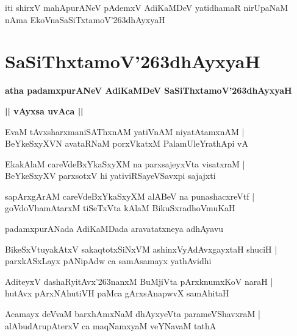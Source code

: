 \documentclass[twoside,12pt,openright]{book}
\def\S{\char'263}
\newcounter{shloka}[chapter]
\def\uvaca#1{\centerline{{\large\textbf{#1}}}}
\begin{document}
\begin{center}
iti shirxV mahApurANeV pAdemxV AdiKaMDeV yatidhamaR nirUpaNaM nAma EkoVnaSaSiTxtamoV\S dhAyxyaH 
\end{center}

\chapter{SaSiThxtamoV\S dhAyxyaH}

\begin{center}
{\LARGE\bfseries atha padamxpurANeV AdiKaMDeV SaSiThxtamoV\S dhAyxyaH}
\end{center}

\uvaca{|| vAyxsa uvAca ||}

\begin{shloka}
EvaM tAvxsharxmaniSAThxnAM yatiVnAM niyatAtamxnAM |\\
BeYkeSxyXVN avataRNaM porxVkatxM PalamUleYrathApi vA 
\end{shloka}

\begin{shloka}
EkakAlaM careVdeBxYkaSxyXM na parxsajeyxVta visatxraM |\\
BeYkeSxyXV parxsotxV hi yativiRSayeVSavxpi sajajxti 
\end{shloka}

\begin{shloka}
sapArxgArAM careVdeBxYkaSxyXM alABeV na punashacxreVtf |\\
goVdoVhamAtarxM tiSeTxVta kAlaM BikuSxradhoVmuKaH
\end{shloka}

\begin{center}
padamxpurANada AdiKaMDada aravatatxneya adhAyavu 
\end{center}

\begin{shloka}
BikeSxVtuyakAtxV sakaqtotxSiNxVM ashinxVyAdAvxgayxtaH shuciH |\\
parxkASxLayx pANipAdw ca samAsamayx yathAvidhi
\end{shloka}

\begin{shloka}
AditeyxV dashaRyitAvx\S nanxM BuMjiVta pArxknumxKoV naraH |\\
hutAvx pArxNAhutiVH paMca gArxsAnapwvX samAhitaH 
\end{shloka}

\begin{shloka}
Acamayx deVvaM barxhAmxNaM dhAyxyeVta parameVShavxraM |\\
alAbudArupAterxV ca maqNamxyaM veYNavaM tathA 
\end{shloka}
\end{document}

